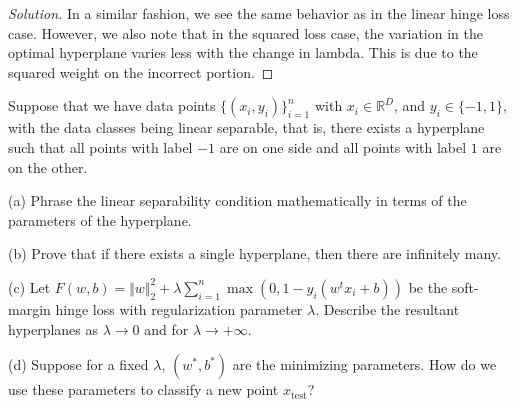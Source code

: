 \documentclass[10pt]{article}
\newenvironment{problem}[2][]{\begin{trivlist}
\item[\hskip \labelsep {\bfseries #1}\hskip \labelsep {\bfseries #2.}]}{\end{trivlist}}
\begin{document}
\begin{proof}[Solution]
In a similar fashion, we see the same behavior as in the linear hinge loss case. However, we also note that in the squared loss case, the variation in the optimal hyperplane varies less with the change in lambda. This is due to the squared weight on the incorrect portion.



\end{proof}

\begin{problem}{Question 2}

Suppose that we have data points $\{(x_i, y_i)\}_{i=1}^n$ with $x_i \in \mathbb{R}^D$, and $y_i \in \{ -1,1\}$, with the data classes being linear separable, that is, there exists a hyperplane such that all points with label $-1$ are on one side and all points with label $1$ are on the other.

(a) Phrase the linear separability condition mathematically in terms of the parameters of the hyperplane.

(b) Prove that if there exists a single hyperplane, then there are infinitely many.

(c) Let $F(w,b) = \Vert w \Vert_2^2 + \lambda \sum_{i=1}^n \max(0,1-y_i(w^tx_i +b))$ be the soft-margin hinge loss with regularization parameter $\lambda$. Describe the resultant hyperplanes as $\lambda \to 0$ and for $\lambda \to +\infty$.

(d) Suppose for a fixed $\lambda$, $(w^*, b^*)$ are the minimizing parameters. How do we use these parameters to classify a new point $x_{\text{test}}$?

\end{problem}
\end{document}
